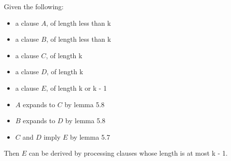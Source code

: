 \documentclass[manuscript]{acmart}
\begin{document}
    \begin{lemma}
        Given the following:
        \begin{itemize}
            \item a clause $A$, of length less than k
            \item a clause $B$, of length less than k
            \item a clause $C$, of length k
            \item a clause $D$, of length k
            \item a clause $E$, of length k or k - 1
            \item $A$ expands to $C$ by lemma 5.8
            \item $B$ expands to $D$ by lemma 5.8
            \item $C$ and $D$ imply $E$ by lemma 5.7
        \end{itemize}
        Then $E$ can be derived by processing clauses whose length
        is at most k - 1.
    \end{lemma}
\end{document}
